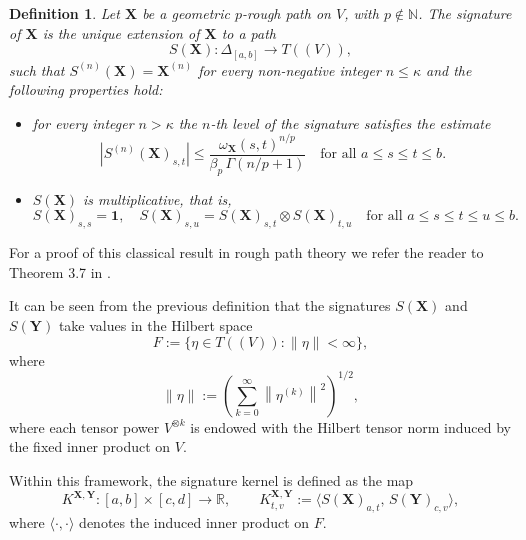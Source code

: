 \documentclass{article}%
\newtheorem{definition}[theorem]{Definition}
\begin{document}
\begin{definition}
Let $\mathbf{X}$ be a geometric $p$-rough path on $V$, with $p \notin \mathbb{N}$.  
The signature of $\mathbf{X}$ is the unique extension of $\mathbf{X}$ to a path
\[
S(\mathbf{X}) : \Delta_{[a,b]} \to T((V)),
\]
such that $S^{(n)}(\mathbf{X}) = \mathbf{X}^{(n)}$ for every non-negative integer $n \leq \kappa$ and the following properties hold:
\begin{itemize}
\item
for every integer $n > \kappa$  the $n$-th level of the signature satisfies the estimate 
\[
\left|S^{(n)}(\mathbf{X})_{s,t}\right |
\le
\frac{\omega_{\mathbf{X}}(s,t)^{n/p}}{\beta_p\,\Gamma(n/p+1)} \quad \text{for all } a \le s \le t  \le b.
\]
\item
$S(\mathbf{X})$ is multiplicative, that is,
\[
S(\mathbf{X})_{s,s} = \mathbf{1}, \quad 
S(\mathbf{X})_{s,u} = S(\mathbf{X})_{s,t}\otimes S(\mathbf{X})_{t,u}
\quad \text{for all } a \le s \le t \le u \le b.
\]
\end{itemize}
\end{definition}

For a proof of this classical result in rough path theory we refer the reader to Theorem 3.7 in \cite{lyons2007differential}.\newline

It can be seen from the previous definition that the signatures \( S(\mathbf{X}) \) and \( S(\mathbf{Y}) \) take values in the Hilbert space
\[
F := \Big\{ \eta \in T((V)) : \|\eta\| < \infty \Big\},
\]
where
\[
\|\eta\| := \left( \sum_{k=0}^\infty \left\|\eta^{(k)}\right\|^2 \right)^{1/2},
\]
where each tensor power \(V^{\otimes k}\) is endowed with the Hilbert tensor norm induced by the fixed inner product on \(V\).

Within this framework, the signature kernel is defined as the map
\[
K^{\mathbf{X}, \mathbf{Y}} : [a,b] \times [c,d] \to \mathbb{R}, 
\qquad 
K^{\mathbf{X}, \mathbf{Y}}_{t,v} := \big\langle S(\mathbf{X})_{a,t},\, S(\mathbf{Y})_{c,v} \big\rangle,
\]
where \(\langle \cdot, \cdot \rangle\) denotes the induced inner product on $F$.
\end{document}
